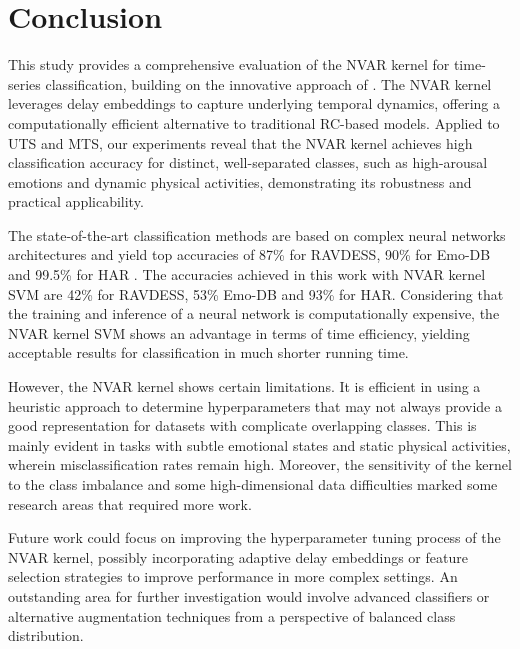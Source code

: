 \chapter{Conclusion} \label{chap:conclusion}

This study provides a comprehensive evaluation of the NVAR kernel for time-series classification, building on the innovative approach of \cite{felice2023}. The NVAR kernel leverages delay embeddings to capture underlying temporal dynamics, offering a computationally efficient alternative to traditional RC-based models. Applied to UTS and MTS, our experiments reveal that the NVAR kernel achieves high classification accuracy for distinct, well-separated classes, such as high-arousal emotions and dynamic physical activities, demonstrating its robustness and practical applicability.

The state-of-the-art classification methods are based on complex neural networks architectures  and yield top accuracies of 87\% for RAVDESS, 90\% for Emo-DB and 99.5\% for HAR \cite{luna2021multimodal, emodb_perf, har_perf}. The accuracies achieved in this work with NVAR kernel SVM are 42\% for RAVDESS, 53\% Emo-DB and 93\% for HAR. Considering that the training and inference of a neural network is computationally expensive, the NVAR kernel SVM shows an advantage in terms of time efficiency, yielding acceptable results for classification in much shorter running time.

However, the NVAR kernel shows certain limitations. It is efficient in using a heuristic approach to determine hyperparameters that may not always provide a good representation for datasets with complicate overlapping classes. This is mainly evident in tasks with subtle emotional states and static physical activities, wherein misclassification rates remain high. Moreover, the sensitivity of the kernel to the class imbalance and some high-dimensional data difficulties marked some research areas that required more work. 

Future work could focus on improving the hyperparameter tuning process of the NVAR kernel, possibly incorporating adaptive delay embeddings or feature selection strategies to improve performance in more complex settings. An outstanding area for further investigation would involve advanced classifiers or alternative augmentation techniques from a perspective of balanced class distribution.